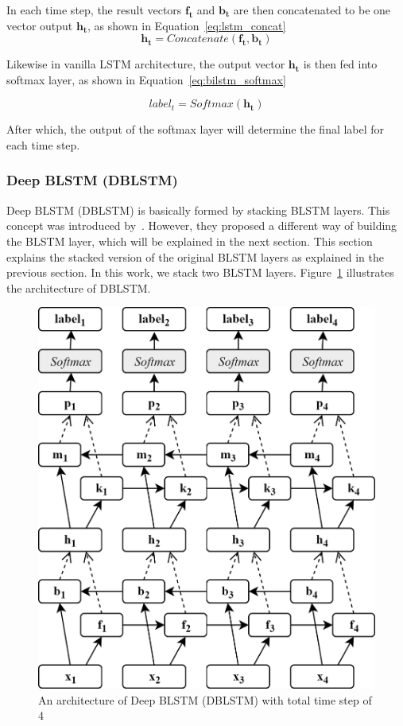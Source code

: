 In each time step, the result vectors $\mathbf{f_{t}}$ and $\mathbf{b_{t}}$ are then concatenated to be one vector output $\mathbf{h_{t}}$, as shown in Equation~\ref{eq:lstm_concat}
\begin{equation}
\label{eq:lstm_concat}
\mathbf{h_{t}} = Concatenate(\mathbf{f_{t}}, \mathbf{b_{t}})
\end{equation}

Likewise in vanilla LSTM architecture, the output vector $\mathbf{h_{t}}$ is then fed into softmax layer, as shown in Equation~\ref{eq:bilstm_softmax}

\begin{equation}
\label{eq:bilstm_softmax}
label_{t} = Softmax(\mathbf{h_{t}})
\end{equation}

After which, the output of the softmax layer will determine the final label for each time step.

\subsubsection{Deep BLSTM (DBLSTM)}
Deep BLSTM (DBLSTM) is basically formed by stacking BLSTM layers. This concept was introduced by~\cite{zhou2015end}. However, they proposed a different way of building the BLSTM layer, which will be explained in the next section. This section explains the stacked version of the original BLSTM layers as explained in the previous section. In this work, we stack two BLSTM layers. Figure~\ref{fig:dblstm} illustrates the architecture of DBLSTM.

\begin{figure}
	\centering
	\includegraphics[width=0.75\linewidth]{images/dblstm}
	\caption{An architecture of Deep BLSTM (DBLSTM) with total time step of 4}
	\label{fig:dblstm}
\end{figure}


